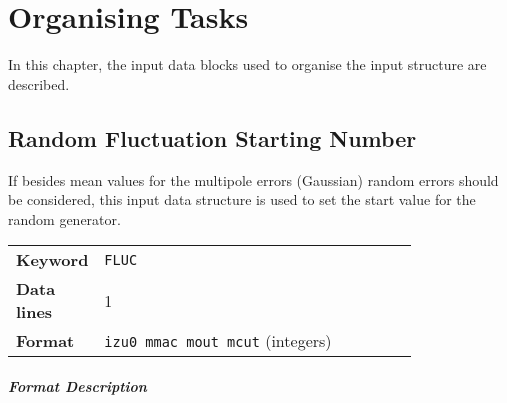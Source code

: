 
\chapter{Organising Tasks} \label{OrgTask}

In this chapter, the input data blocks used to organise the input structure are described.

\section{Random Fluctuation Starting Number} \label{FluNum}

If besides mean values for the multipole errors (Gaussian) random errors should be considered, this input data structure is used to set the start value for the random generator.

\bigskip
\begin{tabular}{@{}lp{0.8\linewidth}}
    \textbf{Keyword}    & \texttt{FLUC} \\
    \textbf{Data lines} & 1 \\
    \textbf{Format}     & \texttt{izu0 mmac mout mcut} \/(integers)
\end{tabular}

\paragraph{Format Description}~

